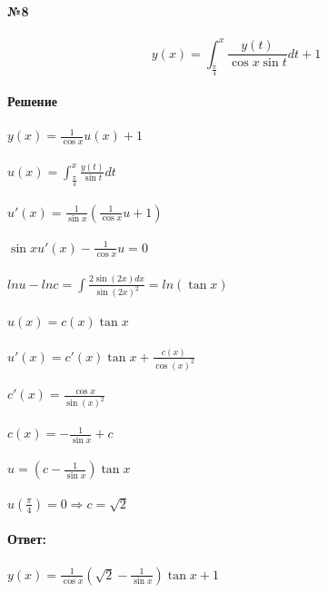 \documentclass[10pt,a4paper]{article}
\begin{document}
	\noindent\textbf{№8} \\ \\
	$$y(x)=\int_{\frac{\pi}{4}}^x \frac{y(t)}{\cos x\sin t} dt + 1$$ \\
	\textbf{Решение}\\\\
	$y(x)=\frac{1}{\cos x} u(x) + 1$\\ \\ 
	$u(x)=\int_{\frac{\pi}{4}}^x \frac{y(t)}{\sin t} dt$\\ \\
	$u'(x)=\frac{1}{\sin x} (\frac{1}{\cos x}u + 1)$\\ \\
	$\sin x u'(x) - \frac{1}{\cos x}u=0$\\ \\
	$ln u - ln c = \int \frac{2 \sin(2x) dx}{\sin(2x)^2} = ln(\tan x)$\\ \\
	$u(x)=c(x) \tan x$\\ \\
	$u'(x)=c'(x) \tan x + \frac{c(x)}{\cos(x)^2}$\\ \\ 
	$c'(x)=\frac{\cos x}{\sin(x)^2}$\\ \\
	$c(x)=-\frac{1}{\sin x} + c$\\ \\
	$u=(c - \frac{1}{\sin x})\tan x$\\ \\
	$u(\frac{\pi}{4})=0 \Rightarrow c = \sqrt{2}$\\ \\
	\textbf{Ответ:} \\ \\
	$y(x)=\frac{1}{\cos x}(\sqrt{2} - \frac{1}{\sin x}) \tan x + 1$\\ \\
\end{document}
